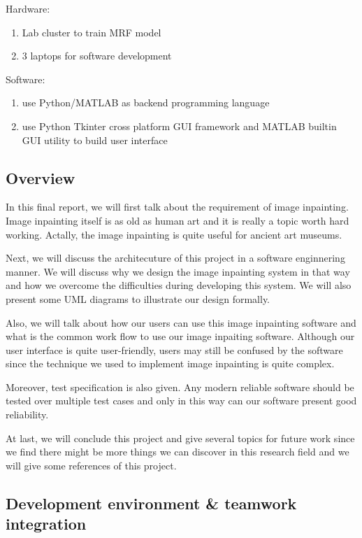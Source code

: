 Hardware:
\begin{enumerate}
\item Lab cluster to train MRF model
\item 3 laptops for software development
\end{enumerate}

Software:
\begin{enumerate}
\item use Python/MATLAB as backend programming language
\item use Python Tkinter cross platform GUI framework and MATLAB builtin
    GUI utility to build user interface
\end{enumerate}

\subsection{Overview}
In this final report, we will first talk about the requirement of image
inpainting. Image inpainting itself is as old as human art and it is really
a topic worth hard working. Actally, the image inpainting is quite useful
for ancient art museums.

Next, we will discuss the architecuture of this project in a software
enginnering manner. We will discuss why we design the image inpainting
system in that way and how we overcome the difficulties during developing
this system. We will also present some UML diagrams to illustrate our
design formally.

Also, we will talk about how our users can use this image inpainting 
software and what is the common work flow to use our image inpaiting
software. Although our user interface is quite user-friendly, users may
still be confused by the software since the technique we used to implement
image inpainting is quite complex.

Moreover, test specification is also given. Any modern reliable software
should be tested over multiple test cases and only in this way can our
software present  good reliability.

At last, we will conclude this project and give several topics for future
work since we find there might be more things we can discover in this
research field and we will give some references of this project.

\subsection{Development environment \& teamwork integration}
